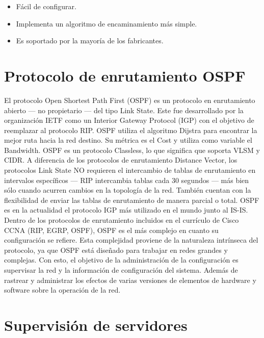\begin{itemize}
	\item Fácil de configurar.
	\item Implementa un algoritmo de encaminamiento más simple.
	\item Es soportado por la mayoría de los fabricantes. \cite{rip}
\end{itemize}

\section{Protocolo de enrutamiento OSPF}

\noindent
El protocolo Open Shortest Path First (OSPF) es un protocolo en enrutamiento abierto — no propietario — del tipo Link State. Este fue desarrollado por la organización IETF como un Interior Gateway Protocol (IGP) con el objetivo de reemplazar al protocolo RIP.
\newline
OSPF utiliza el algoritmo Dijstra para encontrar la mejor ruta hacia la red destino. Su métrica es el Cost y utiliza como variable el Bandwidth. OSPF es un protocolo Classless, lo que significa que soporta VLSM y CIDR.  
\newline
A diferencia de los protocolos de enrutamiento Distance Vector, los protocolos Link State NO requieren el intercambio de tablas de enrutamiento en intervalos específicos — RIP intercambia tablas cada 30 segundos — más bien sólo cuando acurren cambios en la topología de la red. También cuentan con la flexibilidad de enviar las tablas de enrutamiento de manera parcial o total. OSPF es en la actualidad el protocolo IGP más utilizado en el mundo junto al IS-IS.
\newline
Dentro de los protocolos de enrutamiento incluidos en el currículo de Cisco CCNA (RIP, EGRP, OSPF), OSPF es el más complejo en cuanto su configuración se refiere. Esta complejidad proviene de la naturaleza intrínseca del protocolo, ya que OSPF está diseñado para trabajar en redes grandes y complejas. \cite{ospf}
\newline
\newline
Con esto, el objetivo de la administración de la configuración es supervisar la red y la información de configuración del sistema. Además de rastrear y administrar los efectos de varias versiones de elementos de hardware y software sobre la operación de la red.
\newline

\section{Supervisión de servidores}

